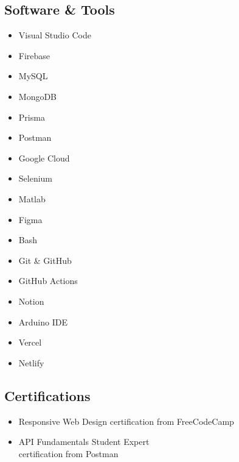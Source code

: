 \documentclass[%
               doublesided,
               paper=a4,
               fontsize=10pt
              ]{my-resume}
\begin{document}
{    \vspace{0.5em}
    \subsection {Software \& Tools}
    \begin{itemize}
        \item {Visual Studio Code}
        \item {Firebase}
        \item {MySQL}
        \item {MongoDB}
        \item {Prisma}
        \item {Postman}
        \item {Google Cloud}
        \item {Selenium}
        \item {Matlab}
        \item {Figma}
        \item {Bash}
        \item {Git \& GitHub}
        \item {GitHub Actions}
        \item {Notion}  
        \item {Arduino IDE}
        \item {Vercel}
        \item {Netlify}
    \end{itemize}
    
    \vspace{0.5em}
    
    \subsection{Certifications}
    \begin{itemize}
        \item {Responsive Web Design certification from FreeCodeCamp}
        \item {API Fundamentals Student Expert \\ certification from Postman}
    \end{itemize}

}
\end{document}
